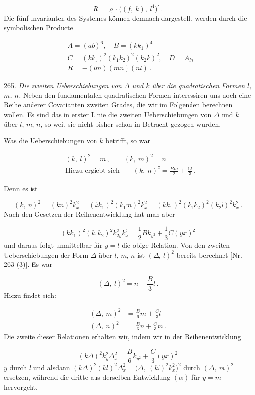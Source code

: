 \documentclass[11pt]{article}
\providecommand{\weberpage}[1]{}
\providecommand{\weq}[2]{\begin{equation}\tag{#1}#2\end{equation}}
\let\Delta\varDelta
\begin{document}
\[
R = \varrho\cdot\big((f,\ k),\ l^4\big)^8\,.
\]
Die fünf Invarianten des Systemes können demnach dargestellt werden durch die
symbolischen Producte

\[
\begin{aligned}
&A=(ab)^6,\quad B=(kk_1)^4\\
&C=(kk_1)^2(k_1k_2)^2(k_2k)^2,\quad D=A_{ln}\\
&R=-(lm)(mn)(nl)\,.
\end{aligned}
\]

265. \textit{Die zweiten Ueberschiebungen von $\Delta$ und $k$ über die
quadratischen Formen $l$, $m$, $n$.} Neben den fundamentalen quadratischen
Formen interessiren uns noch eine Reihe anderer Covarianten zweiten Grades,
die wir im Folgenden berechnen wollen. Es sind das in erster Linie die
zweiten Ueberschiebungen von $\Delta$ und $k$ über $l$, $m$, $n$, so weit sie
nicht bisher schon in Betracht gezogen wurden.

Was die Ueberschiebungen von $k$ betrifft, so war

\weq{1}{\begin{aligned}
&(k,\ l)^2 = m\,, \qquad (k,\ m)^2 = n\\[2pt]
&\text{Hiezu ergiebt sich}\qquad (k,\ n)^2 = \frac{Bm}{2}+\frac{Cl}{3}\,.
\end{aligned}}


\weberpage{287}

Denn es ist

\[
(k,\ n)^2 = (kn)^2k_x^2 = (kk_1)^2(k_1m)^2k_x^2 = (kk_1)^2(k_1k_2)^2(k_2l)^2k_x^2\,.
\]
Nach den Gesetzen der Reihenentwicklung hat man aber

\[
(kk_1)^2(k_1k_2)^2k_{2y}^2k_x^2 = \frac{1}{2}Bk_{y^2}+\frac{1}{3}C(yx)^2
\]
und daraus folgt unmittelbar für $y=l$ die obige Relation. Von den zweiten
Ueberschiebungen der Form $\Delta$ über $l$, $m$, $n$ ist $(\Delta,\ l)^2$
bereits berechnet [Nr. 263 (3)]. Es war

\[
(\Delta,\ l)^2 = n-\frac{B}{3}l\,.
\]
Hiezu findet sich:

\weq{2}{\begin{aligned}
(\Delta,\ m)^2 &= \frac{B}{6}m+\frac{C}{3}l\\
(\Delta,\ n)^2 &= \frac{B}{6}n+\frac{C}{3}m\,.
\end{aligned}}
Die zweite dieser Relationen erhalten wir, indem wir in der
Reihenentwicklung

\weq{$\alpha$}{(k\Delta)^2k_y^2\Delta_x^2 = \frac{B}{6}k_{y^2}+\frac{C}{3}(yx)^2}
$y$ durch $l$ und alsdann $(k\Delta)^2(kl)^2\Delta_x^2 = \big(\Delta,\
(kl)^2k_x^2\big)^2$ durch $(\Delta,\ m)^2$ ersetzen, während die dritte aus
derselben Entwicklung $(\alpha)$ für $y=m$ hervorgeht.
\end{document}
